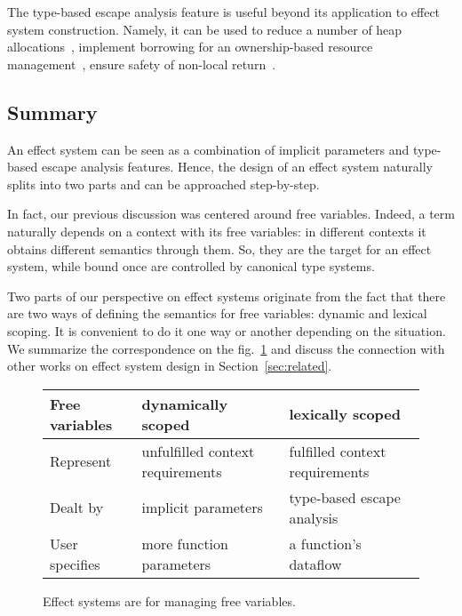 \documentclass[acmsmall]{acmart}
\begin{document}
The type-based escape analysis feature is useful beyond its application to effect system construction.
Namely, it can be used to reduce a number of heap allocations~\cite{lorenzen2024oxidizing}, implement borrowing for an ownership-based resource management~\cite{matsakis2014rust, lorenzen2024oxidizing}, ensure safety of non-local return~\cite{akhin2021kotlin}.

\subsection{Summary} \label{subsec:idea-summary}

An effect system can be seen as a combination of implicit parameters and type-based escape analysis features.
Hence, the design of an effect system naturally splits into two parts and can be approached step-by-step.

In fact, our previous discussion was centered around free variables.
Indeed, a term naturally depends on a context with its free variables: in different contexts it obtains different semantics through them.
So, they are the target for an effect system, while bound once are controlled by canonical type systems.

Two parts of our perspective on effect systems originate from the fact that there are two ways of defining the semantics for free variables: dynamic and lexical scoping.
It is convenient to do it one way or another depending on the situation.
We summarize the correspondence on the fig.\ \ref{fig:free-vars} and discuss the connection with other works on effect system design in Section\ \ref{sec:related}.

\begin{figure}
    \centering
    \begin{tabular}{|l|l|l|}
        \hline
        Free variables & dynamically scoped & lexically scoped \\
        \hline
        Represent & unfulfilled context requirements & fulfilled context requirements \\
        Dealt by & implicit parameters & type-based escape analysis \\
        User specifies & more function parameters & a function’s dataflow \\
        \hline
    \end{tabular}
    \caption{Effect systems are for managing free variables.}
    \label{fig:free-vars}
\end{figure}
\end{document}
